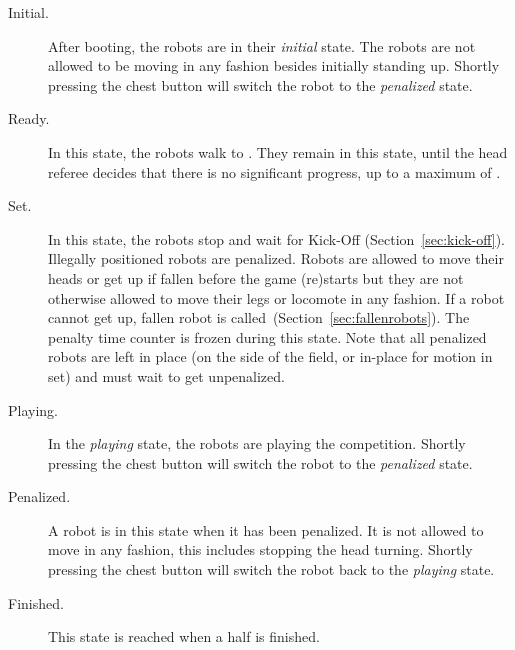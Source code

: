 \begin{description}
	\item[Initial.] After booting, the robots are in their \emph{initial} state. The robots are not allowed to be moving in any fashion besides initially standing up. Shortly pressing the chest button will switch the robot to the \emph{penalized} state.
	
	\item[Ready.] In this state, the robots walk to . They remain in this state, until the head referee decides that there is no significant progress, up to a maximum of \KickOffAutoTime.
	
	\item[Set.] In this state, the robots stop and wait for Kick-Off  (\cf Section~\ref{sec:kick-off}).
	Illegally positioned robots are penalized.
	Robots are allowed to move their heads or get up if fallen before the game (re)starts but they are not otherwise allowed to move their legs or locomote in any fashion.
	If a robot cannot get up, fallen robot is called~(\cf Section~\ref{sec:fallenrobots}).
	The penalty time counter is frozen during this state.
	Note that all penalized robots are left in place (on the side of the field, or in-place for motion in set) and must wait to get unpenalized.
	
	\item[Playing.] In the \emph{playing} state, the robots are playing the competition. Shortly pressing the chest button will switch the robot to the \emph{penalized} state.
	
	\item[Penalized.] A robot is in this state when it has been penalized. It is not allowed to move in any fashion,  this includes stopping the head turning. Shortly pressing the chest button will switch the robot back to the \emph{playing} state.
	
	\item[Finished.] This state is reached when a half is finished.



    
\end{description}

